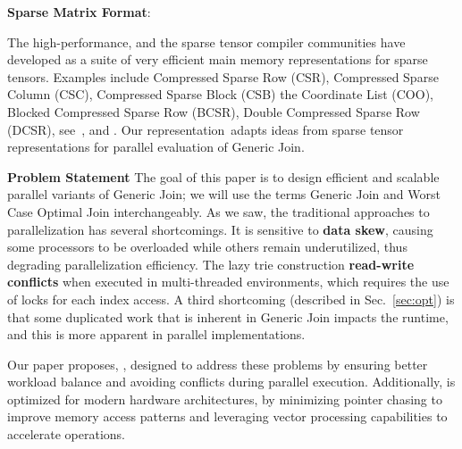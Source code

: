 \addvspace{\smallskipamount}
\noindent\textbf{Sparse Matrix Format}:

The high-performance, and the sparse tensor compiler communities have
developed as a suite of very efficient main memory representations for
sparse tensors.  Examples include Compressed Sparse Row (CSR),
Compressed Sparse Column (CSC),
Compressed Sparse Block (CSB)
the Coordinate List (COO), Blocked
Compressed Sparse Row (BCSR), Double Compressed Sparse Row (DCSR),
see~\cite{DBLP:conf/spaa/BulucFFGL09},
\cite[Fig.5]{DBLP:journals/pacmpl/KjolstadKCLA17} and
\cite[Fig.2]{DBLP:journals/pacmpl/ChouKA18}.  Our
representation~\indexlayout adapts ideas from sparse tensor
representations for parallel evaluation of Generic Join.

\addvspace{\baselineskip}

\noindent\textbf{Problem Statement} The goal of this paper is to
design efficient and scalable parallel variants of Generic Join; we
will use the terms Generic Join and Worst Case Optimal Join
interchangeably.  As we saw, the traditional approaches to
parallelization has several shortcomings. It is sensitive to
\textbf{data skew}, causing some processors to be overloaded while
others remain underutilized, thus degrading parallelization
efficiency.  The lazy trie construction \textbf{read-write conflicts}
when executed in multi-threaded environments, which requires the use
of locks for each index access.  A third shortcoming (described in
Sec.~\ref{sec:opt}) is that some duplicated work that is inherent in
Generic Join impacts the runtime, and this is more apparent in
parallel implementations.

Our paper proposes, \name, designed to address these problems by
ensuring better workload balance and avoiding conflicts during
parallel execution.  Additionally, \name is optimized for modern
hardware architectures, by minimizing pointer chasing to improve
memory access patterns and leveraging vector processing capabilities
to accelerate operations.

